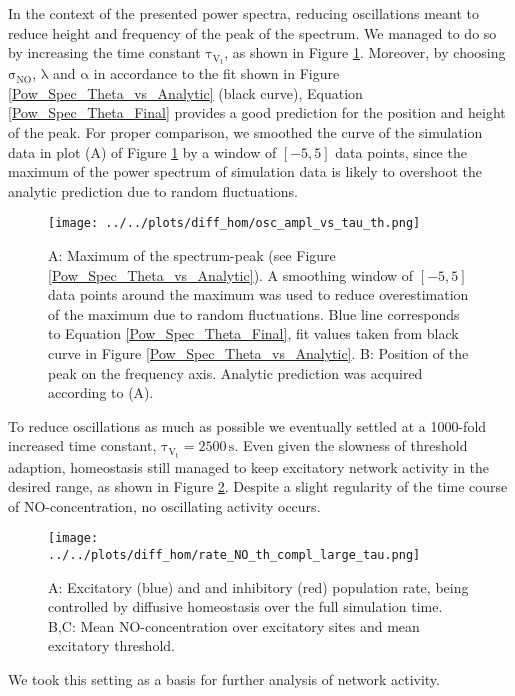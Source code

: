 \documentclass[10pt,a4paper]{article}
\begin{document}
In the context of the presented power spectra, reducing oscillations meant to reduce height and frequency of the peak of the spectrum. We managed to do so by increasing the time constant $\mathrm{\tau_{V_t}}$, as shown in Figure \ref{Peak_Prop_vs_Theta}. Moreover, by choosing $\mathrm{\sigma_{NO}}$, $\mathrm{\lambda}$ and $\mathrm{\alpha}$ in accordance to the fit shown in Figure \ref{Pow_Spec_Theta_vs_Analytic} (black curve), Equation \eqref{Pow_Spec_Theta_Final} provides a good prediction for the position and height of the peak. For proper comparison, we smoothed the curve of the simulation data in plot (A) of Figure \ref{Peak_Prop_vs_Theta} by a window of $\mathrm{[-5,5]}$ data points, since the maximum of the power spectrum of simulation data is likely to overshoot the analytic prediction due to random fluctuations.  
\begin{figure}
\texttt{[image: ../../plots/diff\_hom/osc\_ampl\_vs\_tau\_th.png]}
\caption{A: Maximum of the spectrum-peak (see Figure \ref{Pow_Spec_Theta_vs_Analytic}). A smoothing window of $\mathrm{[-5,5]}$ data points around the maximum was used to reduce overestimation of the maximum due to random fluctuations. Blue line corresponds to Equation \eqref{Pow_Spec_Theta_Final}, fit values taken from black curve in Figure \ref{Pow_Spec_Theta_vs_Analytic}. B: Position of the peak on the frequency axis. Analytic prediction was acquired according to (A).}
\label{Peak_Prop_vs_Theta}
\end{figure} 
To reduce oscillations as much as possible we eventually settled at a 1000-fold increased time constant, $\mathrm{\tau_{V_t}=2500\,s}$. Even given the slowness of threshold adaption, homeostasis still managed to keep excitatory network activity in the desired range, as shown in Figure \ref{full_sim_osci_slow_tau_th}. Despite a slight regularity of the time course of NO-concentration, no oscillating activity occurs.  
\begin{figure}
\texttt{[image: ../../plots/diff\_hom/rate\_NO\_th\_compl\_large\_tau.png]}
\caption{A: Excitatory (blue) and and inhibitory (red) population rate, being controlled by diffusive homeostasis over the full simulation time. B,C: Mean NO-concentration over excitatory sites and mean excitatory threshold.}
\label{full_sim_osci_slow_tau_th}
\end{figure}
We took this setting as a basis for further analysis of network activity.
\end{document}
